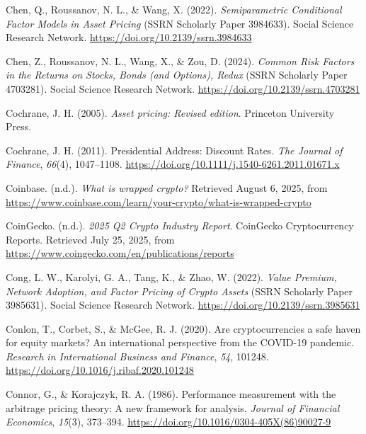 \documentclass[
  12pt,
  a4paper,
  openany]{scrbook}
\newlength{\cslhangindent}
\newenvironment{CSLReferences}[2] %
 {\begin{list}{}{%
  \setlength{\itemindent}{0pt}
  \setlength{\leftmargin}{0pt}
  \setlength{\parsep}{0pt}
  \ifodd #1
   \setlength{\leftmargin}{\cslhangindent}
   \setlength{\itemindent}{-1\cslhangindent}
  \fi
  \setlength{\itemsep}{#2\baselineskip}}}
 {\end{list}}
\begin{document}
\begin{CSLReferences}{1}{0}
Chen, Q., Roussanov, N. L., \& Wang, X. (2022). \emph{Semiparametric
Conditional Factor Models in Asset Pricing} (SSRN Scholarly Paper
3984633). Social Science Research Network.
\url{https://doi.org/10.2139/ssrn.3984633}

Chen, Z., Roussanov, N. L., Wang, X., \& Zou, D. (2024). \emph{Common
Risk Factors in the Returns on Stocks, Bonds (and Options), Redux} (SSRN
Scholarly Paper 4703281). Social Science Research Network.
\url{https://doi.org/10.2139/ssrn.4703281}

Cochrane, J. H. (2005). \emph{Asset pricing: Revised edition}. Princeton
University Press.

Cochrane, J. H. (2011). Presidential Address: Discount Rates. \emph{The
Journal of Finance}, \emph{66}(4), 1047--1108.
\url{https://doi.org/10.1111/j.1540-6261.2011.01671.x}

Coinbase. (n.d.). \emph{What is wrapped crypto?} Retrieved August 6,
2025, from
\url{https://www.coinbase.com/learn/your-crypto/what-is-wrapped-crypto}

CoinGecko. (n.d.). \emph{2025 Q2 Crypto Industry Report}. CoinGecko
Cryptocurrency Reports. Retrieved July 25, 2025, from
\url{https://www.coingecko.com/en/publications/reports}

Cong, L. W., Karolyi, G. A., Tang, K., \& Zhao, W. (2022). \emph{Value
Premium, Network Adoption, and Factor Pricing of Crypto Assets} (SSRN
Scholarly Paper 3985631). Social Science Research Network.
\url{https://doi.org/10.2139/ssrn.3985631}

Conlon, T., Corbet, S., \& McGee, R. J. (2020). Are cryptocurrencies a
safe haven for equity markets? An international perspective from the
COVID-19 pandemic. \emph{Research in International Business and
Finance}, \emph{54}, 101248.
\url{https://doi.org/10.1016/j.ribaf.2020.101248}

Connor, G., \& Korajczyk, R. A. (1986). Performance measurement with the
arbitrage pricing theory: A new framework for analysis. \emph{Journal of
Financial Economics}, \emph{15}(3), 373--394.
\url{https://doi.org/10.1016/0304-405X(86)90027-9}


\end{CSLReferences}
\end{document}
